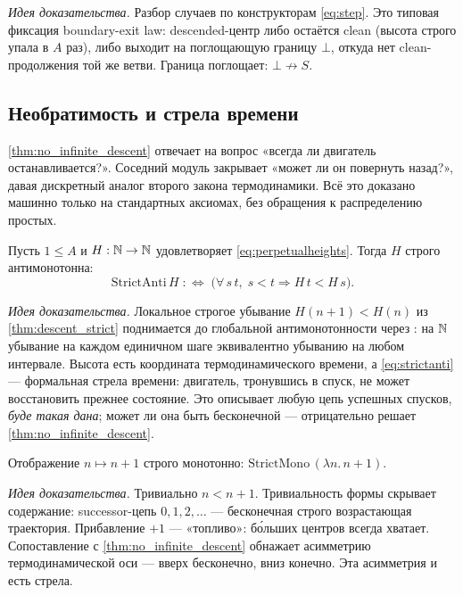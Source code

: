 \emph{Идея доказательства.} Разбор случаев по конструкторам \cref{eq:step}. Это типовая фиксация
boundary-exit law: descended-центр либо остаётся clean (высота строго упала в $A$ раз), либо выходит
на поглощающую границу $\bot$, откуда нет clean-продолжения той же ветви. Граница поглощает:
$\bot\not\to S$.

\subsection{Необратимость и стрела времени}

\cref{thm:no_infinite_descent} отвечает на вопрос «всегда ли двигатель останавливается?». Соседний
модуль  закрывает «может ли он повернуть назад?», давая дискретный аналог
второго закона термодинамики. Всё это доказано машинно только на стандартных аксиомах, без обращения
к распределению простых.

\begin{theorem}\label{thm:engine_never_returns}
\green{}\; Пусть $1\le A$ и $H:\mathbb{N}\to\mathbb{N}$ удовлетворяет \cref{eq:perpetualheights}. Тогда $H$ строго
антимонотонна:
\begin{equation}\label{eq:strictanti}
  \mathrm{StrictAnti}\,H \;:\Longleftrightarrow\; \bigl(\forall\, s\,t,\; s<t \Rightarrow H\,t<H\,s\bigr).
\end{equation}
\end{theorem}

\emph{Идея доказательства.} Локальное строгое убывание $H(n+1)<H(n)$ из \cref{thm:descent_strict}
поднимается до глобальной антимонотонности через : на $\mathbb{N}$ убывание
на каждом единичном шаге эквивалентно убыванию на любом интервале. Высота есть координата
термодинамического времени, а \cref{eq:strictanti} --- формальная стрела времени: двигатель, тронувшись
в спуск, не может восстановить прежнее состояние. Это описывает любую цепь успешных спусков, \emph{буде
такая дана}; может ли она быть бесконечной --- отрицательно решает \cref{thm:no_infinite_descent}.

\begin{theorem}\label{thm:fuel_ascent_strictMono}
\green{}\; Отображение $n\mapsto n+1$ строго монотонно: $\mathrm{StrictMono}\,(\lambda n.\,n+1)$.
\end{theorem}

\emph{Идея доказательства.} Тривиально $n<n+1$. Тривиальность формы скрывает содержание: successor-цепь
$0,1,2,\dots$ --- бесконечная строго возрастающая траектория. Прибавление $+1$ --- «топливо»: б\'{о}льших
центров всегда хватает. Сопоставление с \cref{thm:no_infinite_descent} обнажает асимметрию
термодинамической оси --- вверх бесконечно, вниз конечно. Эта асимметрия и есть стрела.

